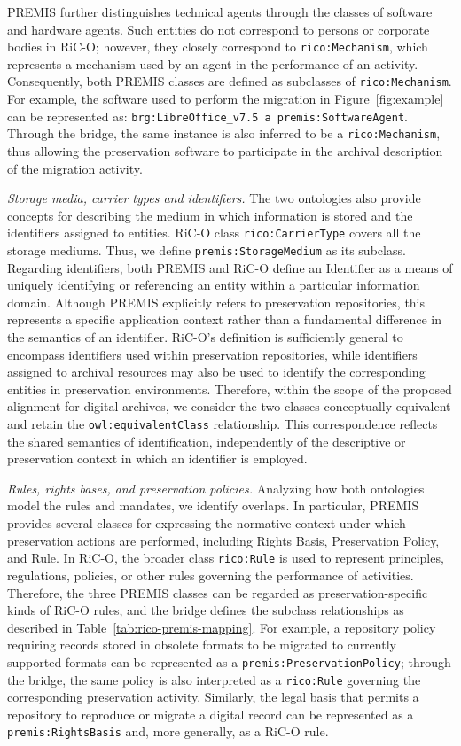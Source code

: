 \documentclass[runningheads]{llncs}
\begin{document}
PREMIS further distinguishes technical agents through the classes of software and hardware agents. Such
entities do not correspond to persons or corporate bodies in RiC-O; however,
they closely correspond to \texttt{rico:Mechanism}, which represents a
mechanism used by an agent in the performance of an activity. Consequently, both
PREMIS classes are defined as subclasses of \texttt{rico:Mechanism}. For
example, the software used to perform the migration in Figure~\ref{fig:example}
can be represented as: \texttt{brg:LibreOffice\_v7.5 a premis:SoftwareAgent}.
%
Through the bridge, the same instance is also inferred to be a
\texttt{rico:Mechanism}, thus allowing the preservation software to participate
in the archival description of the migration activity.

\emph{Storage media, carrier types and identifiers.}
The two ontologies also provide concepts for describing the medium in which
information is stored and the identifiers assigned to entities. RiC-O class \texttt{rico:CarrierType} covers all the storage mediums. Thus, we define \texttt{premis:StorageMedium} as its subclass. 
Regarding identifiers, both PREMIS and RiC-O define an Identifier as a means of uniquely identifying or referencing an entity within a particular information domain. Although PREMIS explicitly refers to preservation repositories, this represents a specific application context rather than a fundamental difference in the semantics of an identifier. RiC-O's definition is sufficiently general to encompass identifiers used within preservation repositories, while identifiers assigned to archival resources may also be used to identify the corresponding entities in preservation environments. Therefore, within the scope of the proposed alignment for digital archives, we consider the two classes conceptually equivalent and retain the \texttt{owl:equivalentClass} relationship. This correspondence reflects the shared semantics of identification, independently of the descriptive or preservation context in which an identifier is employed.

\emph{Rules, rights bases, and preservation policies.} Analyzing how both ontologies model the rules and mandates, we identify overlaps. In particular, PREMIS provides several classes for expressing the
normative context under which preservation actions are performed, including
Rights Basis, Preservation Policy, and Rule. In RiC-O, the broader class \texttt{rico:Rule} is used
to represent principles, regulations, policies, or other rules governing the
performance of activities. Therefore, the three PREMIS classes can be regarded as
preservation-specific kinds of RiC-O rules, and the bridge defines the subclass relationships as described in Table~\ref{tab:rico-premis-mapping}.
%
For example, a repository policy requiring records stored in obsolete formats
to be migrated to currently supported formats can be represented as a
\texttt{premis:PreservationPolicy}; through the bridge, the same policy is also
interpreted as a \texttt{rico:Rule} governing the corresponding preservation
activity. Similarly, the legal basis that permits a repository to reproduce or
migrate a digital record can be represented as a
\texttt{premis:RightsBasis} and, more generally, as a RiC-O rule.
\end{document}
